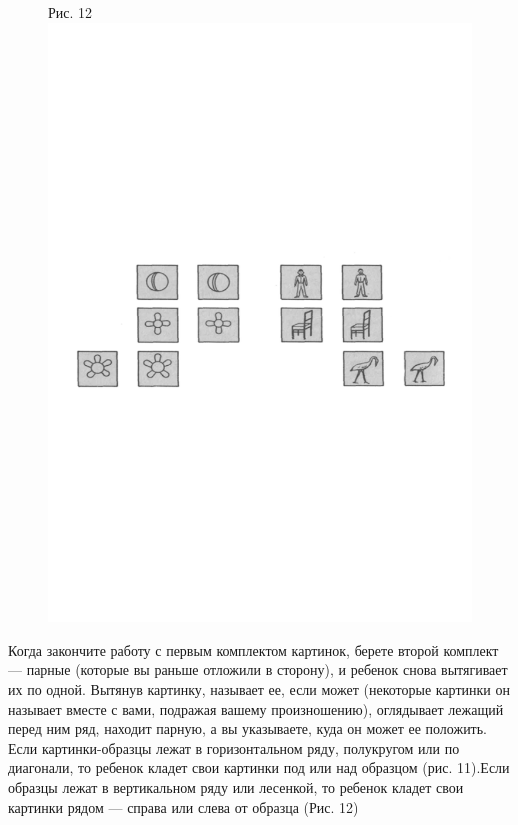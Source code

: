 \documentclass[a5paper]{book}
\begin{document}
\begin{figure}
\centering
Рис. 12\includegraphics[width=\linewidth]{media/media/image12.png}
\end{figure}

Когда закончите работу с первым комплектом картинок, берете второй
комплект --- парные (которые вы раньше отложили в сторону), и ребенок
снова вытягивает их по одной. Вытянув картинку, называет ее, если может
(некоторые картинки он называет вместе с вами, подражая вашему
произношению), оглядывает лежащий перед ним ряд, находит парную, а вы
указываете, куда он может ее положить. Если картинки-образцы лежат в
горизонтальном ряду, полукругом или по диагонали, то ребенок кладет свои
картинки под или над образцом (рис. 11).Если образцы лежат в
вертикальном ряду или лесенкой, то ребенок кладет свои картинки рядом
--- справа или слева от образца (Рис. 12)
\end{document}
